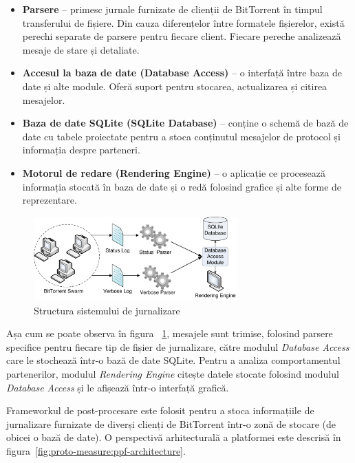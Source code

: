 \begin{itemize}
  \item \textbf{Parsere} -- primesc jurnale furnizate de clienții de BitTorrent
  în timpul transferului de fișiere. Din cauza diferențelor între formatele
  fișierelor, există perechi separate de parsere pentru fiecare client.
  Fiecare pereche analizează mesaje de stare și detaliate.
  \item \textbf{Accesul la baza de date (Database Access)} -- o interfață între baza de date
  și alte module. Oferă suport pentru stocarea, actualizarea și citirea
  mesajelor.
  \item \textbf{Baza de date SQLite (SQLite Database)} -- conține o schemă de bază de date cu
  tabele proiectate pentru a stoca conținutul mesajelor de protocol și
  informația despre parteneri.
  \item \textbf{Motorul de redare (Rendering Engine)} -- o aplicație ce procesează informația
  stocată în baza de date și o redă folosind grafice și alte forme de
  reprezentare.
\end{itemize}

\begin{figure}[h]
  \begin{center}
    \includegraphics[width=0.7\textwidth]{src/img/proto-measure/logarch-not-use}
  \end{center}
  \caption{Structura sistemului de jurnalizare}
  \label{fig:proto-measure:logarch}
\end{figure}

Așa cum se poate observa în figura ~\ref{fig:proto-measure:logarch},
mesajele sunt trimise, folosind parsere specifice pentru fiecare tip de fișier
de jurnalizare, către modulul \textit{Database Access} care le stochează
într-o bază de date SQLite. Pentru a analiza comportamentul partenerilor,
modulul \textit{Rendering Engine} citește datele stocate folosind modulul
\textit{Database Access} și le afișează într-o interfață grafică.

Frameworkul de post-procesare este folosit pentru a stoca informațiile de
jurnalizare furnizate de diverși clienți de BitTorrent într-o zonă de stocare
(de obicei o bază de date). O perspectivă arhitecturală a platformei este
descrisă în figura~\ref{fig:proto-measure:ppf-architecture}.

